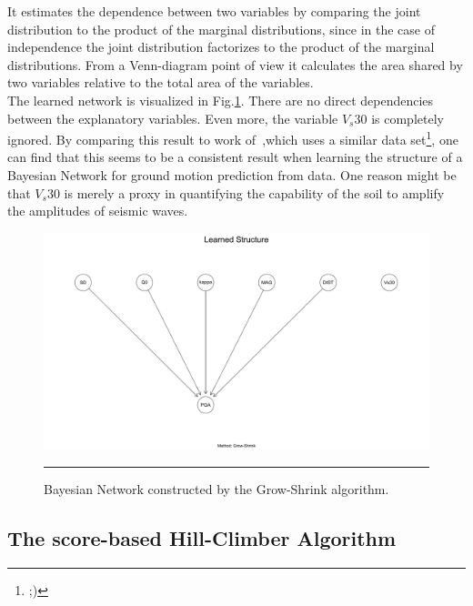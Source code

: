 It estimates the dependence between two variables by comparing the joint distribution to the product of the marginal distributions, since in the case of independence the joint distribution factorizes to the product of the marginal distributions. From a Venn-diagram point of view it calculates the area shared by two variables relative to the total area of the variables.\\
The learned network is visualized in Fig.\ref{fig:gs}. There are no direct dependencies between the explanatory variables. Even more, the variable $V_s30$ is completely ignored. By comparing this result to work of~\citep{Vogel2014},which uses a similar data set\footnote{ ;)}, one can find that this seems to be a consistent result when learning the structure of a Bayesian Network for ground motion prediction from data. One reason might be that $V_s30$ is merely a proxy in quantifying the capability of the soil to amplify the amplitudes of seismic waves.\\

\begin{figure}[htbp]
	\centering
		\includegraphics[scale=0.33]{Figures/gs_one.pdf}
		\rule{35em}{0.5pt}
	\caption[Contraint-based Grow-Shrink Network]{Bayesian Network constructed by the Grow-Shrink algorithm.}
	\label{fig:gs}
\end{figure}

\subsection{The score-based Hill-Climber Algorithm}

